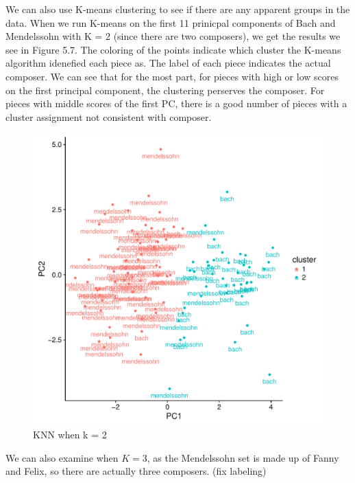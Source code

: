 \documentclass[12pt,twoside]{reedthesis}
\theoremstyle{definition}
\theoremstyle{definition}
\theoremstyle{definition}
\theoremstyle{remark}
\begin{document}
We can also use K-means clustering to see if there are any apparent
groups in the data. When we run K-means on the first 11 prinicpal
components of Bach and Mendelssohn with K = 2 (since there are two
composers), we get the results we see in Figure 5.7. The coloring of the
points indicate which cluster the K-means algorithm idenefied each piece
as. The label of each piece indicates the actual composer. We can see
that for the most part, for pieces with high or low scores on the first
principal component, the clustering perserves the composer. For pieces
with middle scores of the first PC, there is a good number of pieces
with a cluster assignment not consistent with composer.
\begin{figure}[H]
\centering
\includegraphics[scale = .5]{images/kmeans_2_b.pdf}
\caption{KNN when k = 2}
\label{subd}
\end{figure}
We can also examine when \(K=3\), as the Mendelssohn set is made up of
Fanny and Felix, so there are actually three composers. (fix labeling)
\end{document}
